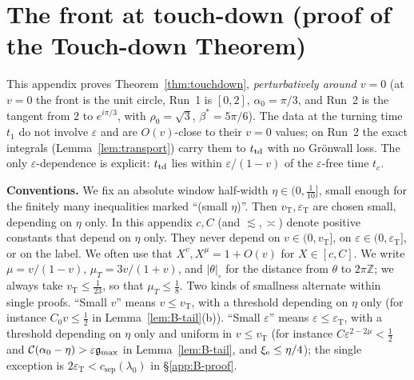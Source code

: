 \section{The front at touch-down (proof of the Touch-down Theorem)}\label{app:touchdown}

This appendix proves Theorem~\ref{thm:touchdown}, \emph{perturbatively around $v=0$} (at $v=0$ the front is the unit
circle, Run~1 is $[0,2]$, $\alpha_0=\pi/3$, and Run~2 is the tangent from $2$ to $e^{i\pi/3}$, with $\rho_0=\sqrt3$,
$\beta^*=5\pi/6$). The data at the turning time $t_1$ do not involve $\varepsilon$ and are $O(v)$-close to their $v=0$
values; on Run~2 the exact integrals (Lemma~\ref{lem:transport}) carry them to $t_{\mathrm{td}}$ with no Gr\"onwall loss. The only
$\varepsilon$-dependence is explicit: $t_{\mathrm{td}}$ lies within $\varepsilon/(1-v)$ of the $\varepsilon$-free time $t_c$.

\textbf{Conventions.} We fix an absolute window half-width $\eta\in(0,\frac1{10}]$, small enough for the finitely many
inequalities marked ``(small $\eta$)''. Then $v_{\mathrm T},\varepsilon_{\mathrm T}$ are chosen small, depending on $\eta$
only. In this appendix $c,C$ (and $\lesssim,\asymp$) denote positive constants that depend on $\eta$ only. They never depend on
$v\in(0,v_{\mathrm T}]$, on $\varepsilon\in(0,\varepsilon_{\mathrm T}]$, or on the label. We often use that $X^v,X^\mu=1+O(v)$ for
$X\in[c,C]$. We write $\mu=v/(1-v)$, $\mu_T=3v/(1+v)$, and $|\theta|_\circ$ for the distance from $\theta$ to $2\pi\mathbb Z$;
we always take $v_{\mathrm T}\le\frac1{23}$, so that $\mu_T\le\frac18$. Two kinds of smallness alternate within single
proofs. ``Small $v$'' means $v\le v_{\mathrm T}$, with a threshold depending on $\eta$ only (for instance $C_0v\le\frac12$ in
Lemma~\ref{lem:B-tail}(b)). ``Small $\varepsilon$'' means $\varepsilon\le\varepsilon_{\mathrm T}$, with a threshold depending
on $\eta$ only and uniform in $v\le v_{\mathrm T}$ (for instance $C\varepsilon^{2-2\mu}<\frac12$ and
$\mathcal C(\alpha_0-\eta)>\varepsilon\mathfrak{g}_{\max}$ in Lemma~\ref{lem:B-tail}, and $\xi_{\mathrm{e}}\le\eta/4$); the single exception is
$2\varepsilon_{\mathrm T}<c_{\mathrm{sep}}(\lambda_0)$ in \S\ref{app:B-proof}.

